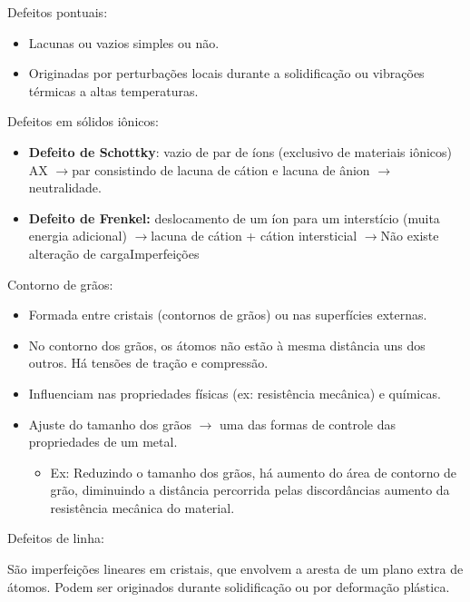 Defeitos pontuais:

\begin{itemize}
	\item Lacunas ou vazios simples ou não.
	\item Originadas por perturbações locais durante a solidificação ou vibrações térmicas a altas temperaturas.
\end{itemize}

Defeitos em sólidos iônicos:

\begin{itemize}
	\item \textbf{Defeito de Schottky}: vazio de par de íons (exclusivo de materiais iônicos) AX $\rightarrow$par consistindo de lacuna de cátion e lacuna de ânion $\rightarrow$ neutralidade.
	\item \textbf{Defeito de Frenkel:} deslocamento de um íon para um interstício (muita energia adicional) $\rightarrow$lacuna de cátion + cátion intersticial $\rightarrow$Não existe alteração de cargaImperfeições
\end{itemize}


Contorno de grãos:

\begin{itemize}
	\item Formada entre cristais (contornos de grãos) ou nas superfícies externas.
	\item No contorno dos grãos, os átomos não estão à mesma distância uns dos outros. Há tensões de tração e compressão.
	\item Influenciam nas propriedades físicas (ex: resistência mecânica) e químicas.
	\item Ajuste do tamanho dos grãos $\rightarrow$ uma das formas de controle das propriedades de um metal.
	\begin{itemize}
		\item Ex: Reduzindo o tamanho dos grãos, há aumento do área de contorno de grão, diminuindo a distância percorrida pelas discordâncias aumento da resistência mecânica do material.
	\end{itemize}
\end{itemize}

Defeitos de linha:

São imperfeições lineares em cristais, que envolvem a aresta de um plano extra de átomos. Podem ser originados durante solidificação ou por deformação plástica.


